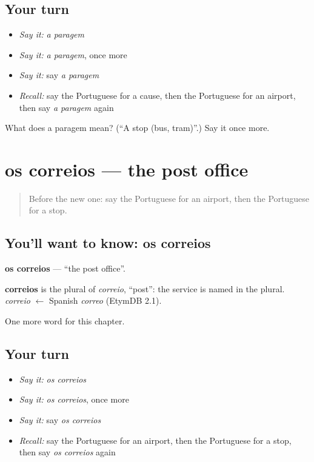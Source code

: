 \subsection*{Your turn}
\begin{itemize}
\raggedright
  \item \emph{Say it:} \emph{a paragem}
  \item \emph{Say it:} \emph{a paragem}, once more
  \item \emph{Say it:} say \emph{a paragem}
  \item \emph{Recall:} say the Portuguese for a cause, then the Portuguese for an airport, then say \emph{a paragem} again
\end{itemize}

\begin{tcolorbox}[breakable,colback=teal!4,colframe=teal!35!black,title={Before you move on}]
What does a paragem mean? (\textquotedblleft{}A stop (bus, tram)\textquotedblright{}.) Say it once more.
\end{tcolorbox}
\section[os correios]{os correios — the post office}

\label{lesson:PT-C85-correios}



\begin{quote}
Before the new one: say the Portuguese for an airport, then the Portuguese for a stop.
\end{quote}

\subsection*{You'll want to know: os correios}
\textbf{os correios} — \textquotedblleft{}the post office\textquotedblright{}.

\begin{cousinweb}
\textbf{correios} is the plural of \emph{correio}, \textquotedblleft{}post\textquotedblright{}: the service is named in the plural. \emph{correio} $\leftarrow$ Spanish \emph{correo} (EtymDB 2.1).
\end{cousinweb}

\begin{grammarlens}[title={What you've built}]
One more word for this chapter.
\end{grammarlens}

\subsection*{Your turn}
\begin{itemize}
\raggedright
  \item \emph{Say it:} \emph{os correios}
  \item \emph{Say it:} \emph{os correios}, once more
  \item \emph{Say it:} say \emph{os correios}
  \item \emph{Recall:} say the Portuguese for an airport, then the Portuguese for a stop, then say \emph{os correios} again
\end{itemize}

